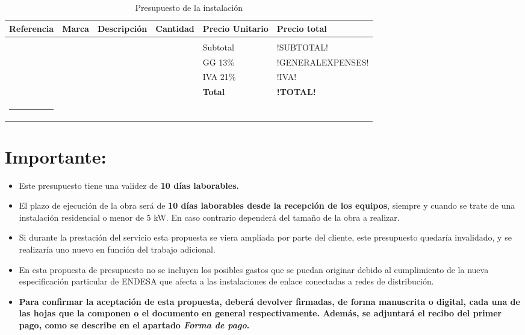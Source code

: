 \documentclass[fontsize=11pt, Myfinal=true, oneside, numbers=noenddot]{report}
\begin{document}
\begin{longtable}{M{2cm}M{1.5cm}M{4.5cm}M{1.5cm}M{1.75cm}M{2cm}}
\caption{Presupuesto de la instalación} \label{tab01-08}\\
\hline
\hline
\rule[-8pt]{0pt}{22pt}{\bfseries{Referencia}}& {\bfseries{Marca}} & {\bfseries{Descripción}} & {\bfseries{Cantidad}} & {\bfseries{Precio Unitario}} & {\bfseries{Precio total}} \\
\hline
\hline
& & & & & \\
\hline
\hline
\vspace{0.5cm}
  &        &                                          &    & Subtotal & !SUBTOTAL! \\
\vspace{0.5cm}
  &        &                                          &    & GG 13\% & !GENERALEXPENSES! \\
\vspace{0.5cm}
  &        &                                          &    & IVA 21\% & !IVA! \\
\vspace{0.5cm}
  &        &                                          &    & \textbf{Total} & \textbf{!TOTAL!} \\
\rule{15.7cm}{2pt}
\end{longtable}
				 
\section*{Importante:}

\begin{itemize}
\item Este presupuesto tiene una validez de \textbf{10 días laborables.}
\item El plazo de ejecución de la obra será de \textbf{10 días laborables desde la recepción de los equipos}, siempre y cuando se trate de una instalación residencial o menor de 5 kW. En caso contrario dependerá del tamaño de la obra a realizar.
\item Si durante la prestación del servicio esta propuesta se viera ampliada por parte del cliente, este presupuesto quedaría invalidado, y se realizaría uno nuevo en función del trabajo adicional.
\item En esta propuesta de presupuesto no se incluyen los posibles gastos que se puedan originar debido al cumplimiento de la nueva especificación particular de ENDESA que afecta a las instalaciones de enlace conectadas a redes de distribución.
\item \textbf{Para confirmar la aceptación de esta propuesta, deberá devolver firmadas, de forma manuscrita o digital, cada una de las hojas que la componen o el documento en general respectivamente. Además, se adjuntará el recibo del primer pago, como se describe en el apartado \textit{Forma de pago}.}
\end{itemize}
\end{document}
